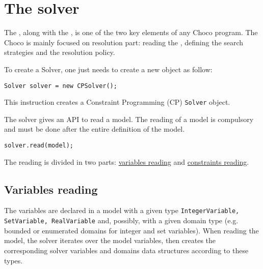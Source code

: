 \label{solver}
\hypertarget{solver}{}


\chapter{The solver}\label{solver:thesolver}\hypertarget{solver:thesolver}{}



The , along with the , is one of the two key elements of any Choco program. The Choco  is mainly focused on resolution part: reading the , defining the search strategies and the resolution policy.  

To create a \gls{Solver}, one just needs to create a new object as follow:
\begin{lstlisting}
Solver solver = new CPSolver();
\end{lstlisting}
This instruction creates a Constraint Programming (CP) {\tt Solver} object.

The solver gives an API to read a model. The reading of a model is compulsory and must be done after the entire definition of the model. 
\begin{lstlisting}
solver.read(model);
\end{lstlisting}
The reading is divided in two parts: \hyperlink{solver:variablesreading}{variables reading} and \hyperlink{solver:constraintsreading}{constraints reading}.

\section{Variables reading}\label{solver:variablesreading}\hypertarget{solver:variablesreading}{}
The variables are declared in a model with a given type \texttt{IntegerVariable, SetVariable, RealVariable} and, possibly, with a given domain type (e.g. bounded or enumerated domains for integer and set variables).
When reading the model, the solver iterates over the model variables, then creates the corresponding solver variables and domains data structures according to these types.

